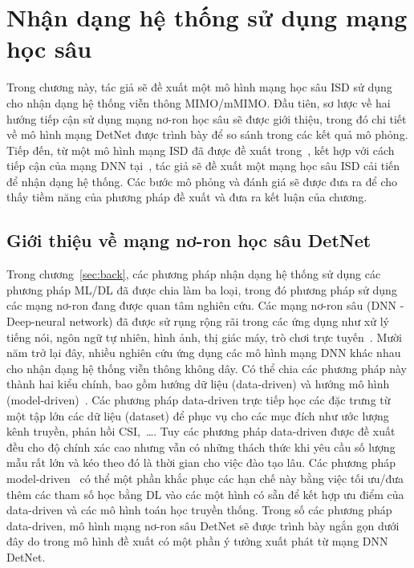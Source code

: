 \clearpage
{}

\setcounter{chapter}{2}
\chapter[NHẬN DẠNG HỆ THỐNG SỬ DỤNG MẠNG HỌC SÂU]{Nhận dạng hệ thống sử dụng mạng học sâu}
\label{sec:ML}

Trong chương này, tác giả sẽ đề xuất một mô hình mạng học sâu ISD sử dụng cho nhận dạng hệ thống viễn thông MIMO/mMIMO. Đầu tiên, sơ lược về hai hướng tiếp cận sử dụng mạng nơ-ron học sâu sẽ được giới thiệu, trong đó chi tiết về mô hình mạng DetNet được trình bày để so sánh trong các kết quả mô phỏng. Tiếp đến, từ một mô hình mạng ISD đã được đề xuất trong~\cite{Mandloi2017}, kết hợp với cách tiếp cận của mạng DNN tại~\cite{Liao2020}, tác giả sẽ đề xuất một mạng học sâu ISD cải tiến để nhận dạng hệ thống. Các bước mô phỏng và đánh giá sẽ được đưa ra để cho thấy tiềm năng của phương pháp đề xuất và đưa ra kết luận của chương. 

\section{Giới thiệu về mạng nơ-ron học sâu DetNet}

Trong chương~\ref{sec:back}, các phương pháp nhận dạng hệ thống sử dụng các phương pháp ML/DL đã được chia làm ba loại, trong đó phương pháp sử dụng các mạng nơ-ron đang được quan tâm nghiên cứu. Các mạng nơ-ron sâu (DNN - Deep-neural network) đã được sử rụng rộng rãi trong các ứng dụng như xử lý tiếng nói, ngôn ngữ tự nhiên, hình ảnh, thị giác máy, trò chơi trực tuyến~\cite{Samek2021}. Mười năm trở lại đây, nhiều nghiên cứu ứng dụng các mô hình mạng DNN khác nhau cho nhận dạng hệ thống viễn thông không dây. Có thể chia các phương pháp này thành hai kiểu chính, bao gồm hướng dữ liệu (data-driven) và hướng mô hình (model-driven)~\cite{Liao2020}. Các phương pháp data-driven trực tiếp học các đặc trưng từ một tập lớn các dữ liệu (dataset) để phục vụ cho các mục đích như ước lượng kênh truyền, phản hồi CSI,~\ldots. Tuy các phương pháp data-driven được đề xuất đều cho độ chính xác cao nhưng vẫn có những thách thức khi yêu cầu số lượng mẫu rất lớn và kéo theo đó là thời gian cho việc đào tạo lâu. Các phương pháp model-driven~\cite{He2019} có thể một phần khắc phục các hạn chế này bằng việc tối ưu/đưa thêm các tham số học bằng DL vào các một hình có sẵn để kết hợp ưu điểm của data-driven và các mô hình toán học truyền thống. Trong số các phương pháp data-driven, mô hình mạng nơ-ron sâu DetNet sẽ được trình bày ngắn gọn dưới đây do trong mô hình đề xuất có một phần ý tưởng xuất phát từ mạng DNN DetNet.

